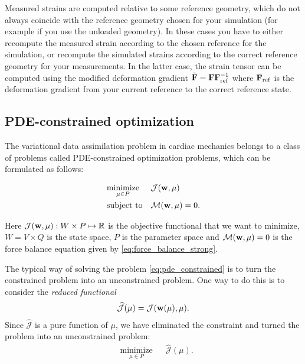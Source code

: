 \begin{remark}
  Measured strains are computed relative to some reference
  geometry, which do not always coincide with the reference geometry
  chosen for your simulation (for example if you use the unloaded geometry). In
  these cases you have to either recompute the measured strain
  according to the chosen reference for the simulation, or recompute
  the simulated strains according to the correct reference geometry for
  your measurements. In the latter case, the strain tensor can be
  computed using the modified deformation gradient $\tilde{\mathbf{F}} = \mathbf{F}
  \mathbf{F}_{\mathrm{ref}}^{-1}$ where $\mathbf{F}_{\mathrm{ref}}$ is the deformation
  gradient from your current reference to the correct reference state. 
\end{remark}


\subsection{PDE-constrained optimization}


The variational data assimilation problem in cardiac mechanics belongs
to a class of problems called PDE-constrained optimization problems,
which can be formulated as follows:

\begin{equation}
  \begin{aligned}
    \label{eq:pde_constrained}
    & \underset{\mu \in P}{\text{minimize}}
    & &  \mathcal{J}(\mathbf{w}, \mu) \\
    & \text{subject to}
    & & \mathcal{M}(\mathbf{w}, \mu) = 0.
  \end{aligned}
\end{equation}

Here $\mathcal{J}(\mathbf{w}, \mu): W \times P \mapsto
\mathbb{R}$ is the objective functional that we want to minimize,
$W = V \times Q$ is the state space, $P$ is the parameter space
and $ \mathcal{M}(\mathbf{w}, \mu) = 0$ is the force balance
equation given by \eqref{eq:force_balance_strong}.



The typical way of solving the problem \eqref{eq:pde_constrained} is to
turn the constrained problem into an unconstrained problem. One way
to do this is to consider the \emph{reduced functional}
\begin{align}
  \widehat{\mathcal{J}}(\mu) = \mathcal{J}(\mathbf{w}(\mu), \mu).
\end{align}
Since $\widehat{\mathcal{J}}$ is a pure function of $\mu$, we have
eliminated the constraint and turned the problem into an unconstrained
problem:
\begin{equation}
  \begin{aligned}
    \label{eq:pde_unconstrained}
    & \underset{\mu \in P}{\text{minimize}}
    & &  \widehat{\mathcal{J}}(\mu).
  \end{aligned}
\end{equation}

